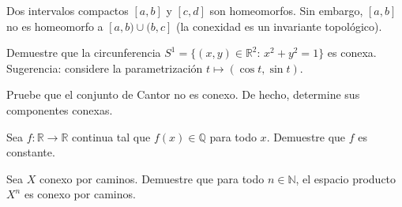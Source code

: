 \begin{theorem}
\label{teo:homeomorfismo-intervalos}
Dos intervalos compactos $[a,b]$ y $[c,d]$ son homeomorfos. Sin embargo, $[a,b]$ no es homeomorfo a $[a,b)\cup(b,c]$ (la conexidad es un invariante topológico).
\end{theorem}

\begin{exercise}
Demuestre que la circunferencia $S^1=\{(x,y)\in\mathbb{R}^2:\,x^2+y^2=1\}$ es conexa. Sugerencia: considere la parametrización $t\mapsto(\cos t,\sin t)$.
\end{exercise}

\begin{exercise}
Pruebe que el conjunto de Cantor no es conexo. De hecho, determine sus componentes conexas.
\end{exercise}

\begin{exercise}
Sea $f\colon\mathbb{R}\to\mathbb{R}$ continua tal que $f(x)\in\mathbb{Q}$ para todo $x$. Demuestre que $f$ es constante.
\end{exercise}

\begin{problem}
Sea $X$ conexo por caminos. Demuestre que para todo $n\in\mathbb{N}$, el espacio producto $X^n$ es conexo por caminos.
\end{problem}

